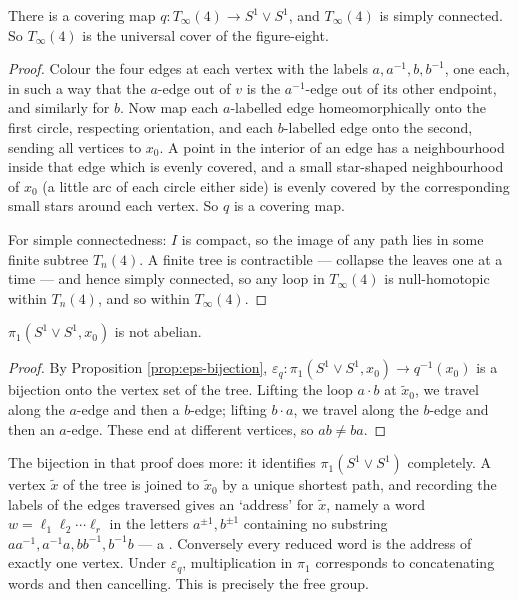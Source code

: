 \begin{proposition} \label{prop:tree-cover}
	There is a covering map $q: T_\infty(4) \to S^1 \vee S^1$, and $T_\infty(4)$ is simply connected. So $T_\infty(4)$ is the universal cover of the figure-eight.
\end{proposition}
\begin{proof}
	Colour the four edges at each vertex with the labels $a, a^{-1}, b, b^{-1}$, one each, in such a way that the $a$-edge out of $v$ is the $a^{-1}$-edge out of its other endpoint, and similarly for $b$. Now map each $a$-labelled edge homeomorphically onto the first circle, respecting orientation, and each $b$-labelled edge onto the second, sending all vertices to $x_0$. A point in the interior of an edge has a neighbourhood inside that edge which is evenly covered, and a small star-shaped neighbourhood of $x_0$ (a little arc of each circle either side) is evenly covered by the corresponding small stars around each vertex. So $q$ is a covering map.

	For simple connectedness: $I$ is compact, so the image of any path lies in some finite subtree $T_n(4)$. A finite tree is contractible --- collapse the leaves one at a time --- and hence simply connected, so any loop in $T_\infty(4)$ is null-homotopic within $T_n(4)$, and so within $T_\infty(4)$.
\end{proof}

\begin{corollary} \label{cor:fig8-nonabelian}
	$\pi_1(S^1 \vee S^1, x_0)$ is not abelian.
\end{corollary}
\begin{proof}
	By Proposition \ref{prop:eps-bijection}, $\varepsilon_q: \pi_1(S^1\vee S^1, x_0) \to q^{-1}(x_0)$ is a bijection onto the vertex set of the tree. Lifting the loop $a \cdot b$ at $\tilde x_0$, we travel along the $a$-edge and then a $b$-edge; lifting $b \cdot a$, we travel along the $b$-edge and then an $a$-edge. These end at different vertices, so $ab \neq ba$.
\end{proof}

The bijection in that proof does more: it identifies $\pi_1(S^1 \vee S^1)$ completely. A
vertex $\tilde x$ of the tree is joined to $\tilde x_0$ by a unique shortest path, and
recording the labels of the edges traversed gives an `address' for $\tilde x$, namely a
word $w = \ell_1\ell_2\cdots\ell_r$ in the letters $a^{\pm1}, b^{\pm1}$ containing no
substring $aa^{-1}, a^{-1}a, bb^{-1}, b^{-1}b$ --- a . Conversely
every reduced word is the address of exactly one vertex. Under $\varepsilon_q$,
multiplication in $\pi_1$ corresponds to concatenating words and then cancelling.
This is precisely the free group.


